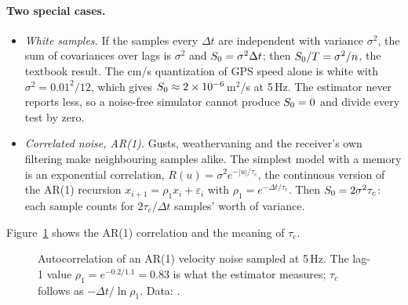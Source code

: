 \paragraph{Two special cases.}
\begin{itemize}[nosep]
  \item \emph{White samples.} If the samples every $\Delta t$ are independent with
        variance $\sigma^2$, the sum of covariances over lags is $\sigma^2$ and
        $S_0 = \sigma^2\Delta t$; then $S_0/T = \sigma^2/n$, the textbook
        result. The cm/s quantization of GPS speed alone is white with
        $\sigma^2 = 0.01^2/12$, which gives $S_0 \approx 2\times10^{-6}$\,m$^2$/s
        at 5\,Hz. The estimator never reports less, so a noise-free simulator
        cannot produce $S_0 = 0$ and divide every test by zero.
  \item \emph{Correlated noise, AR(1).} Gusts, weathervaning and the receiver's
        own filtering make neighbouring samples alike. The simplest model with a
        memory is an exponential correlation, $R(u) = \sigma^2 e^{-|u|/\tau_c}$, the
        continuous version of the AR(1) recursion $x_{i+1} = \rho_1 x_i + \varepsilon_i$
        with $\rho_1 = e^{-\Delta t/\tau_c}$. Then $S_0 = 2\sigma^2\tau_c$: each
        sample counts for $2\tau_c/\Delta t$ samples' worth of variance.
\end{itemize}
Figure~\ref{fig:cond-acf} shows the AR(1) correlation and the meaning of
$\tau_c$.

\begin{figure}[ht]
\centering
{}
\caption{Autocorrelation of an AR(1) velocity noise sampled at 5\,Hz. The lag-1
value $\rho_1 = e^{-0.2/1.1} = 0.83$ is what the estimator measures; $\tau_c$
follows as $-\Delta t/\ln\rho_1$. Data: .}
\label{fig:cond-acf}
\end{figure}

